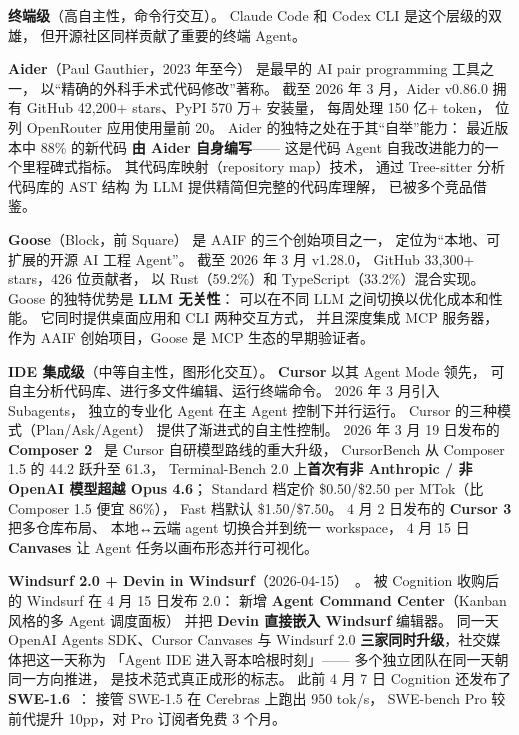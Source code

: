 \textbf{终端级}（高自主性，命令行交互）。
Claude Code 和 Codex CLI 是这个层级的双雄，
但开源社区同样贡献了重要的终端 Agent。

\textbf{Aider}（Paul Gauthier，2023 年至今）
是最早的 AI pair programming 工具之一，
以“精确的外科手术式代码修改”著称。
截至 2026 年 3 月，Aider v0.86.0 拥有
GitHub 42,200+ stars、PyPI 570 万+ 安装量，
每周处理 150 亿+ token，
位列 OpenRouter 应用使用量前 20。
Aider 的独特之处在于其“自举”能力：
最近版本中 88\% 的新代码
\textbf{由 Aider 自身编写}——
这是代码 Agent 自我改进能力的一个里程碑式指标。
其代码库映射（repository map）技术，
通过 Tree-sitter 分析代码库的 AST 结构
为 LLM 提供精简但完整的代码库理解，
已被多个竞品借鉴。

\textbf{Goose}（Block，前 Square）
是 AAIF 的三个创始项目之一，
定位为“本地、可扩展的开源 AI 工程 Agent”。
截至 2026 年 3 月 v1.28.0，
GitHub 33,300+ stars，426 位贡献者，
以 Rust（59.2\%）和 TypeScript（33.2\%）混合实现。
Goose 的独特优势是 \textbf{LLM 无关性}：
可以在不同 LLM 之间切换以优化成本和性能。
它同时提供桌面应用和 CLI 两种交互方式，
并且深度集成 MCP 服务器，
作为 AAIF 创始项目，Goose 是 MCP 生态的早期验证者。

\textbf{IDE 集成级}（中等自主性，图形化交互）。
\textbf{Cursor} 以其 Agent Mode 领先，
可自主分析代码库、进行多文件编辑、运行终端命令。
2026 年 3 月引入 Subagents，
独立的专业化 Agent 在主 Agent 控制下并行运行。
Cursor 的三种模式（Plan/Ask/Agent）
提供了渐进式的自主性控制。
2026 年 3 月 19 日发布的 \textbf{Composer 2}~\cite{cursor3composer2}
是 Cursor 自研模型路线的重大升级，
CursorBench 从 Composer 1.5 的 44.2 跃升至 61.3，
Terminal-Bench 2.0 上\textbf{首次有非 Anthropic / 非 OpenAI 模型超越 Opus 4.6}；
Standard 档定价 \$0.50/\$2.50 per MTok（比 Composer 1.5 便宜 86\%），
Fast 档默认 \$1.50/\$7.50。
4 月 2 日发布的 \textbf{Cursor 3} 把多仓库布局、
本地↔云端 agent 切换合并到统一 workspace，
4 月 15 日 \textbf{Canvases} 让 Agent 任务以画布形态并行可视化。

\textbf{Windsurf 2.0 + Devin in Windsurf}（2026-04-15）~\cite{windsurf2devin}。
被 Cognition 收购后的 Windsurf 在 4 月 15 日发布 2.0：
新增 \textbf{Agent Command Center}（Kanban 风格的多 Agent 调度面板）
并把 \textbf{Devin 直接嵌入 Windsurf} 编辑器。
同一天 OpenAI Agents SDK、Cursor Canvases 与 Windsurf 2.0
\textbf{三家同时升级}，社交媒体把这一天称为
「Agent IDE 进入哥本哈根时刻」——
多个独立团队在同一天朝同一方向推进，
是技术范式真正成形的标志。
此前 4 月 7 日 Cognition 还发布了 \textbf{SWE-1.6}~\cite{cognitionswe16}：
接管 SWE-1.5 在 Cerebras 上跑出 950 tok/s，
SWE-bench Pro 较前代提升 10pp，对 Pro 订阅者免费 3 个月。

